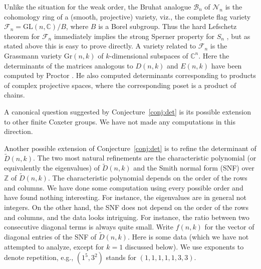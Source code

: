 \documentclass[12pt]{amsart}
\theoremstyle{definition}
\theoremstyle{remark}
\numberwithin{equation}{section}
\begin{document}
Unlike the situation for the weak order, the Bruhat analogue
$\mathcal{B}_n$ of $\mathcal{N}_n$ is the cohomology ring of a
(smooth, projective) variety, viz., the complete flag variety
$\mathcal{F}_n = \mathrm{GL}(n,{\mathbb{C}})/B$, where $B$ is a Borel
subgroup. Thus the hard Lefschetz theorem for $\mathcal{F}_n$
immediately implies the strong Sperner property for $S_n$
\cite{rs:hl}, but as stated above this is easy to prove directly. A
variety related to $\mathcal{F}_n$ is  the Grassmann variety Gr$(n,k)$
of $k$-dimensional subspaces of ${\mathbb{C}}^n$. Here the determinants
of the matrices analogous to $D(n,k)$ and $E(n,k)$ have been computed
by Proctor \cite{proctor}. He also computed determinants corresponding
to products of complex projective spaces, where the corresponding
poset is a product of chains.

A canonical question suggested by Conjecture~\ref{conj:det} is its
possible extension to other finite Coxeter groups. We have not made
any computations in this direction.

Another possible extension of Conjecture~\ref{conj:det} is to refine
the determinant of $\tilde{D}(n,k)$. The two most natural refinements
are the characteristic polynomial (or equivalently the eigenvalues) of
$\tilde{D}(n,k)$ and the Smith normal form (SNF) over ${\mathbb{Z}}$ of
$\tilde{D}(n,k)$. The characteristic polynomial depends on the order
of the rows and columns. We have done some computation using every
possible order and have found nothing interesting. For instance, the
eigenvalues are in general not integers. On the other hand, the SNF
does not depend on the order of the rows and columns, and the data
looks intriguing. For instance, the ratio between two consecutive
diagonal terms is always quite small. Write $f(n,k)$ for the vector of
diagonal entries of the SNF of $\tilde{D}(n,k)$. Here is some data
(which we have not attempted to analyze, except for $k=1$ discussed
below). We use exponents to denote repetition, e.g., $(1^5,3^2)$
stands for $(1,1,1,1,1,3,3)$.
\end{document}
